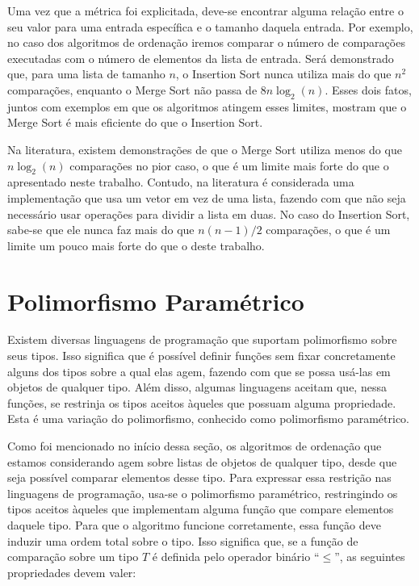 \documentclass[12pt, oneside, a4paper,english,brazil]{abntex2}
\begin{document}
\qquad Uma vez que a m\'etrica foi explicitada, deve-se encontrar alguma rela\c{c}\~ao entre o seu valor para
uma entrada espec\'ifica e o tamanho daquela entrada. Por exemplo, no caso dos algoritmos de ordena\c{c}\~ao
iremos comparar o n\'umero de compara\c{c}\~oes executadas com o n\'umero de elementos da lista de entrada.
Ser\'a demonstrado que, para uma lista de tamanho $n$, o Insertion Sort nunca utiliza mais do que $n^{2}$
compara\c{c}\~oes, enquanto o Merge Sort n\~ao passa de $8 n \log_{2} (n)$. Esses dois fatos,
juntos com exemplos em que os algoritmos atingem esses limites, mostram que o Merge Sort \'e mais eficiente
do que o Insertion Sort.

\qquad Na literatura, existem demonstra\c{c}\~oes de que o Merge Sort utiliza menos do que $n\log_{2}(n)$
compara\c{c}\~oes no pior caso\cite{1}, o que \'e um limite mais forte do que o apresentado neste trabalho.
Contudo, na literatura \'e considerada uma implementa\c{c}\~ao que usa um vetor em vez de uma lista,
fazendo com que n\~ao seja necess\'ario usar opera\c{c}\~oes para dividir a lista em duas. No caso do Insertion
Sort, sabe-se que ele nunca faz mais do
que $n(n - 1) / 2$ compara\c{c}\~oes, o que \'e um limite um pouco mais forte
do que o deste trabalho.

\section{Polimorfismo Param\'etrico}

\qquad Existem diversas linguagens de programa\c{c}\~ao que suportam polimorfismo sobre seus tipos. Isso
significa que \'e poss\'ivel definir fun\c{c}\~oes sem fixar concretamente alguns dos tipos sobre a qual elas
agem, fazendo com que se possa us\'a-las em objetos de qualquer tipo. Al\'em disso, algumas linguagens
aceitam que, nessa fun\c{c}\~oes, se restrinja os tipos aceitos \`aqueles que possuam alguma propriedade.
Esta \'e uma varia\c{c}\~ao do polimorfismo, conhecido como polimorfismo param\'etrico.

\qquad Como foi mencionado no in\'icio dessa se\c{c}\~ao, os algoritmos de ordena\c{c}\~ao que estamos
considerando agem sobre listas de objetos de qualquer tipo, desde que seja poss\'ivel comparar elementos
desse tipo. Para expressar essa restri\c{c}\~ao nas linguagens de programa\c{c}\~ao, usa-se o polimorfismo
param\'etrico, restringindo os tipos aceitos \`aqueles que implementam alguma fun\c{c}\~ao que compare
elementos daquele tipo. Para que o algoritmo funcione corretamente, essa fun\c{c}\~ao deve induzir uma ordem
total sobre o tipo. Isso significa que, se a fun\c{c}\~ao de compara\c{c}\~ao sobre um tipo $T$ \'e definida
pelo operador bin\'ario ``$\le$'', as seguintes propriedades devem valer:
\end{document}
